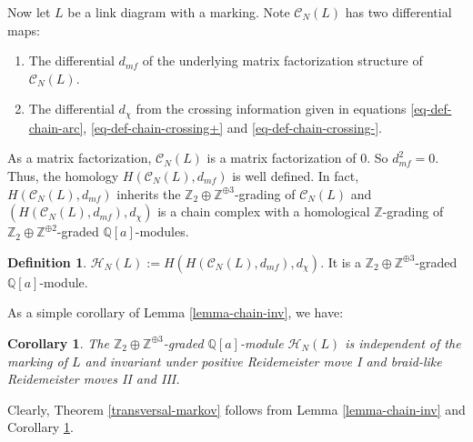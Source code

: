 \documentclass{amsart}
\theoremstyle{plain}
\newtheorem{corollary}[theorem]{Corollary}
\theoremstyle{definition}
\newtheorem{definition}[theorem]{Definition}
\theoremstyle{remark}
\numberwithin{equation}{section}
\begin{document}
Now let $L$ be a link diagram with a marking. Note ${\mathcal{C}}_N(L)$ has two differential maps:
\begin{enumerate}
	\item The differential $d_{mf}$ of the underlying matrix factorization structure of ${\mathcal{C}}_N(L)$. 
  \item The differential $d_\chi$ from the crossing information given in equations \eqref{eq-def-chain-arc}, \eqref{eq-def-chain-crossing+} and \eqref{eq-def-chain-crossing-}.
\end{enumerate}
As a matrix factorization, ${\mathcal{C}}_N(L)$ is a matrix factorization of $0$. So $d_{mf}^2=0$. Thus, the homology $H({\mathcal{C}}_N(L), d_{mf})$ is well defined. In fact, $H({\mathcal{C}}_N(L), d_{mf})$ inherits the ${\mathbb{Z}}_2\oplus {\mathbb{Z}}^{\oplus 3}$-grading of ${\mathcal{C}}_N(L)$ and $(H({\mathcal{C}}_N(L), d_{mf}),d_\chi)$ is a chain complex with a homological ${\mathbb{Z}}$-grading of ${\mathbb{Z}}_2\oplus {\mathbb{Z}}^{\oplus 2}$-graded ${\mathbb{Q}}[a]$-modules.

\begin{definition}\label{def-homology-link}
${\mathcal{H}}_N(L) := H(H({\mathcal{C}}_N(L), d_{mf}),d_\chi)$. It is a ${\mathbb{Z}}_2\oplus {\mathbb{Z}}^{\oplus 3}$-graded ${\mathbb{Q}}[a]$-module.
\end{definition}

As a simple corollary of Lemma \ref{lemma-chain-inv}, we have:

\begin{corollary}\label{cor-homology-inv}
The ${\mathbb{Z}}_2\oplus {\mathbb{Z}}^{\oplus 3}$-graded ${\mathbb{Q}}[a]$-module ${\mathcal{H}}_N(L)$ is independent of the marking of $L$ and invariant under positive Reidemeister move I and braid-like Reidemeister moves II and III.
\end{corollary}

Clearly, Theorem \ref{transversal-markov} follows from Lemma \ref{lemma-chain-inv} and Corollary \ref{cor-homology-inv}.
\end{document}
